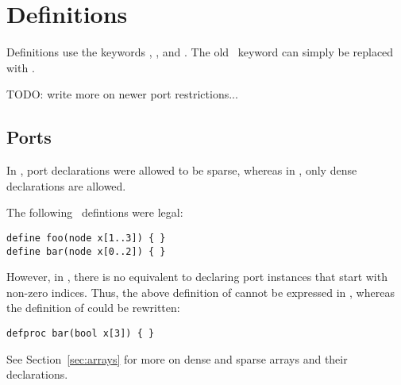 
\section{Definitions}
\label{sec:definitions}

Definitions use the keywords , , and .  
The old \CAST\ keyword  can simply be replaced with .  

TODO: write more on newer port restrictions...

\subsection{Ports}
\label{sec:definitions:ports}

In \CAST, port declarations were allowed to be sparse, 
whereas in \hac, only dense declarations are allowed.

The following \CAST\ defintions were legal:

\begin{verbatim}
define foo(node x[1..3]) { }
define bar(node x[0..2]) { }
\end{verbatim}

However, in \hac, there is no equivalent to declaring port instances
that start with non-zero indices.  
Thus, the above definition of  cannot be expressed in \hac, 
whereas the definition of  could be rewritten:

\begin{verbatim}
defproc bar(bool x[3]) { }
\end{verbatim}

See Section~\ref{sec:arrays} for more on dense and sparse arrays 
and their declarations.  


